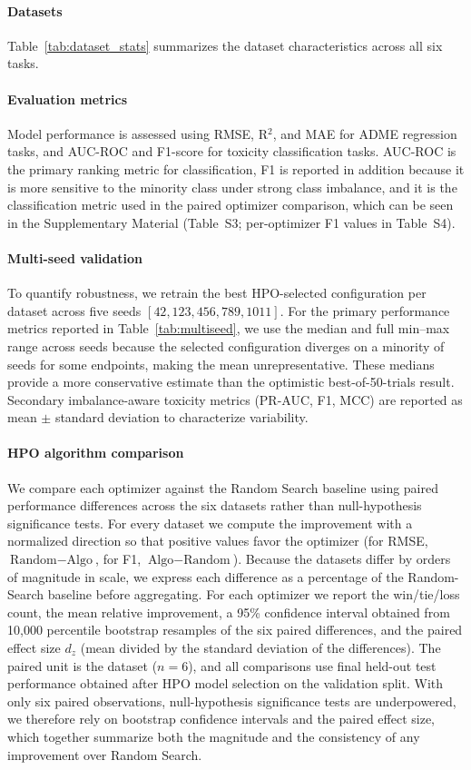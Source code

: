 \documentclass[journal]{IEEEtran}
\begin{document}
\paragraph{Datasets}
Table~\ref{tab:dataset_stats} summarizes the dataset characteristics across all six tasks.

\paragraph{Evaluation metrics}
Model performance is assessed using RMSE, R$^2$, and MAE for ADME regression tasks, and AUC-ROC and F1-score for toxicity classification tasks. AUC-ROC is the primary ranking metric for classification, F1 is reported in addition because it is more sensitive to the minority class under strong class imbalance, and it is the classification metric used in the paired optimizer comparison, which can be seen in the Supplementary Material (Table~S3; per-optimizer F1 values in Table~S4).

\paragraph{Multi-seed validation}
To quantify robustness, we retrain the best HPO-selected configuration per dataset across five seeds $[42, 123, 456, 789, 1011]$. For the primary performance metrics reported in Table~\ref{tab:multiseed}, we use the median and full min--max range across seeds because the selected configuration diverges on a minority of seeds for some endpoints, making the mean unrepresentative. These medians provide a more conservative estimate than the optimistic best-of-50-trials result. Secondary imbalance-aware toxicity metrics (PR-AUC, F1, MCC) are reported as mean $\pm$ standard deviation to characterize variability.

\paragraph{HPO algorithm comparison}
We compare each optimizer against the Random Search baseline using paired performance differences across the six datasets rather than null-hypothesis significance tests. For every dataset we compute the improvement with a normalized direction so that positive values favor the optimizer (for RMSE, $\text{Random}-\text{Algo}$, for F1, $\text{Algo}-\text{Random}$). Because the datasets differ by orders of magnitude in scale, we express each difference as a percentage of the Random-Search baseline before aggregating. For each optimizer we report the win/tie/loss count, the mean relative improvement, a 95\% confidence interval obtained from 10{,}000 percentile bootstrap resamples of the six paired differences, and the paired effect size $d_z$ (mean divided by the standard deviation of the differences). The paired unit is the dataset ($n=6$), and all comparisons use final held-out test performance obtained after HPO model selection on the validation split. With only six paired observations, null-hypothesis significance tests are underpowered, we therefore rely on bootstrap confidence intervals and the paired effect size, which together summarize both the magnitude and the consistency of any improvement over Random Search.
\end{document}
